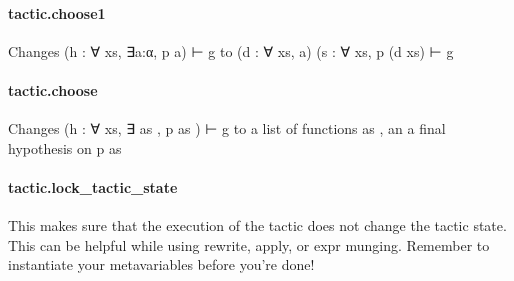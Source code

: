 \documentclass{article}
\begin{document}
\paragraph{tactic.choose1}
\par
Changes 
\colorbox[RGB]{253,246,227}{{{{\color[RGB]{101, 123, 131} (h :  }}}{{{\color[RGB]{133, 153, 0} ∀ }}}{{{\color[RGB]{101, 123, 131} xs, ∃a:α, p a) ⊢ g }}}} to 
\colorbox[RGB]{253,246,227}{{{{\color[RGB]{101, 123, 131} (d :  }}}{{{\color[RGB]{133, 153, 0} ∀ }}}{{{\color[RGB]{101, 123, 131} xs, a) (s :  }}}{{{\color[RGB]{133, 153, 0} ∀ }}}{{{\color[RGB]{101, 123, 131} xs, p (d xs) ⊢ g }}}}\paragraph{tactic.choose}
\par
Changes 
\colorbox[RGB]{253,246,227}{{{{\color[RGB]{101, 123, 131} (h :  }}}{{{\color[RGB]{133, 153, 0} ∀ }}}{{{\color[RGB]{101, 123, 131} xs, ∃ }}}{{{\color[RGB]{133, 153, 0} as }}}{{{\color[RGB]{101, 123, 131} , p  }}}{{{\color[RGB]{133, 153, 0} as }}}{{{\color[RGB]{101, 123, 131} ) ⊢ g }}}} to a list of functions 
\colorbox[RGB]{253,246,227}{{{{\color[RGB]{133, 153, 0} as }}}}, an a final hypothesis on 
\colorbox[RGB]{253,246,227}{{{{\color[RGB]{101, 123, 131} p  }}}{{{\color[RGB]{133, 153, 0} as }}}}\paragraph{tactic.lock\_tactic\_state}
\par
This makes sure that the execution of the tactic does not change the tactic state.
This can be helpful while using rewrite, apply, or expr munging.
Remember to instantiate your metavariables before you're done!
\end{document}
